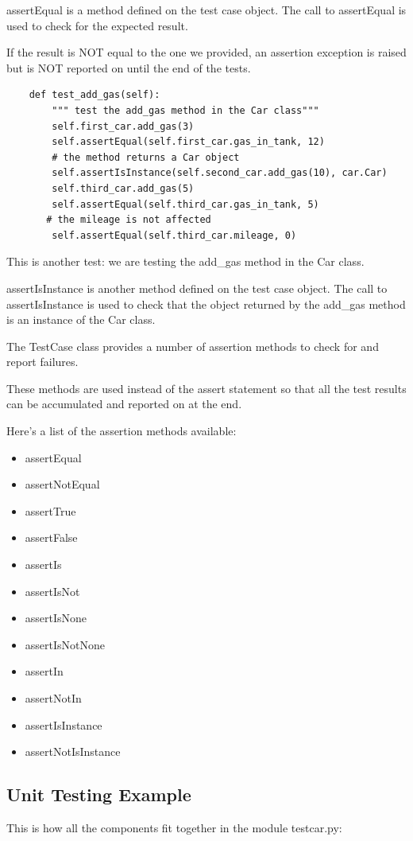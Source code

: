 \documentclass{article}
\begin{document}
assertEqual is a method defined on the test case object.  The call to assertEqual is used to check for the expected result.  

If the result is NOT equal to the one we provided, an assertion exception is raised but is NOT reported on until the end of the tests.

\begin{lstlisting}
    def test_add_gas(self):
        """ test the add_gas method in the Car class""" 
        self.first_car.add_gas(3)
        self.assertEqual(self.first_car.gas_in_tank, 12)
        # the method returns a Car object
        self.assertIsInstance(self.second_car.add_gas(10), car.Car)
        self.third_car.add_gas(5)
        self.assertEqual(self.third_car.gas_in_tank, 5)
       # the mileage is not affected
        self.assertEqual(self.third_car.mileage, 0)
\end{lstlisting}

This is another test:  we are testing the add{\_}gas method in the Car class.

assertIsInstance is another method defined on the test case object.  The call to assertIsInstance is used to check that the object returned by the add{\_}gas method is an instance of the Car class.

The TestCase class provides a number of assertion methods to check for and report failures.

These methods are used instead of the assert statement so that all the test results can be accumulated and reported on at the end.

Here's a list of the assertion methods available:
\begin{itemize}
\item assertEqual
\item assertNotEqual
\item assertTrue
\item assertFalse
\item assertIs
\item assertIsNot
\item assertIsNone
\item assertIsNotNone
\item assertIn
\item assertNotIn
\item assertIsInstance
\item assertNotIsInstance
\end{itemize}

\subsection{Unit Testing Example}
This is how all the components fit together in the module testcar.py:
\end{document}
